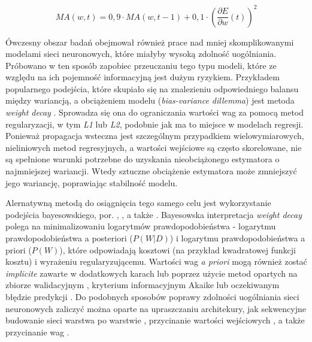 \documentclass[12pt,a4paper,twoside]{article}
\begin{document}
\begin{equation} \label{eq:rmsprop_ma}
  {MA}(w,t) = 0,9 \cdot {MA}(w, t-1) + 0,1 \cdot (\frac{\partial E}{\partial w}(t))^2
\end{equation}

Ówczesny obszar badań obejmował również prace nad mniej skomplikowanymi modelami sieci neuronowych, które miałyby wysoką zdolność uogólniania. Próbowano w ten sposób zapobiec przeuczaniu tego typu modeli, które ze względu na ich pojemność informacyjną jest dużym ryzykiem. Przykładem popularnego podejścia, które skupiało się na znalezieniu odpowiedniego balansu między wariancją, a obciążeniem modelu (\textit{bias-variance dillemma}) jest metoda \textit{weight decay} \citep{hanson1990}. Sprowadza się ona do ograniczania wartości wag za pomocą metod regularyzacji, w tym \textit{L1} lub \textit{L2}, podobnie jak ma to miejsce w modelach regresji. Ponieważ propagacja wsteczna jest szczególnym przypadkiem wielowymiarowych, nieliniowych metod regresyjnych, a wartości wejściowe są często skorelowane, nie są spełnione warunki potrzebne do uzyskania nieobciążonego estymatora o najmniejszej wariancji. Wtedy sztuczne obciążenie estymatora może zmniejszyć jego wariancję, poprawiając stabilność modelu.

Alernatywną metodą do osiągnięcia tego samego celu jest wykorzystanie podejścia bayesowskiego, por. \citet{nowlan1992}, \citet{hinton1993}, a także \citet{edwards1993}. Bayesowska interpretacja \textit{weight decay} polega na minimalizowaniu logarytmów prawdopodobieństwa - logarytmu prawdopodobieństwa a posteriori ($P(W|D)$) i logarytmu prawdopodobieństwa a priori ($P(W)$), które odpowiadają kosztowi (na przykład kwadratowej funkcji kosztu) i wyrażeniu regularyzującemu. Wartości wag \textit{a priori} mogą również zostać \textit{implicite} zawarte w dodatkowych karach \citep{mackay1992} lub poprzez użycie metod opartych na zbiorze walidacyjnym \citep{hastie1990}, kryterium informacyjnym Akaike \citep{akaike1974} lub oczekiwanym błędzie predykcji \citep{moody1994}. Do podobnych sposobów poprawy zdolności uogólniania sieci neuronowych zaliczyć można oparte na upraszczaniu architekury, jak sekwencyjne budowanie sieci warstwa po warstwie \citep{ivakhnenko1968}, przycinanie wartości wejściowych \citep{moody1991}, a także przycinanie wag \citep{lecun1989a}.
\end{document}
